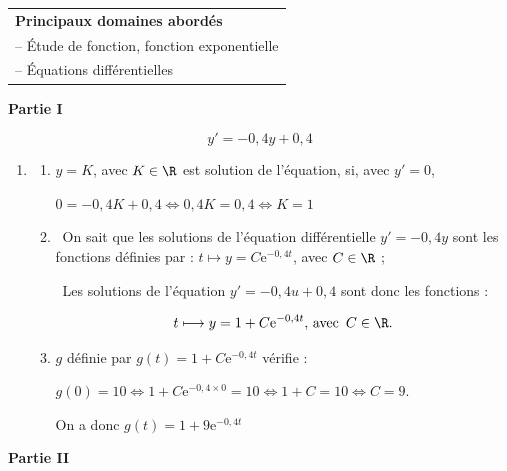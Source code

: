 \medskip

\begin{tabular}{|l|}\hline
\textbf{Principaux domaines abordés}\\
-- Étude de fonction, fonction exponentielle\\
-- Équations différentielles\\ \hline
\end{tabular}

\bigskip

\textbf{Partie I}

\medskip



\[y'= -0,4y + 0,4\]



\medskip

\begin{enumerate}
\item 
	\begin{enumerate}
		\item 
$y = K$, avec $K \in \R$ est solution de l'équation, si, avec $y' = 0$,
		
$0 = -0,4K + 0,4 \iff 0,4K = 0,4 \iff K = 1$
		\item 
\starredbullet~On sait que les solutions de l'équation différentielle $y' = - 0,4y$ sont les fonctions définies par : $t \longmapsto y = C\text{e}^{-0,4t}$, avec $C \in \R$ ;
		
\starredbullet~Les solutions de l'équation $y' = - 0,4u + 0,4$ sont donc les fonctions :

\[t \longmapsto y = 1 + C\text{e}^{-0,4t},\, \text{avec }\,  C \in \R.\]

\item 
$g$ définie par $g(t) = 1 + C\text{e}^{-0,4t}$ vérifie :

$g(0) = 10 \iff 1 + C\text{e}^{-0,4\times 0} = 10 \iff 1 + C = 10 \iff C = 9$.

On a donc $g(t) = 1 + 9\text{e}^{-0,4t}$
	\end{enumerate}
\end{enumerate}

\bigskip

\textbf{Partie II}

\medskip





\smallskip


